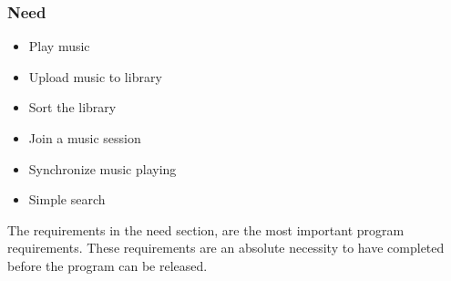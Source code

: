 \subsubsection{Need}


\begin{itemize}
	\item Play music
	\item Upload music to library
	\item Sort the library
	\item Join a music session
	\item Synchronize music playing
	\item Simple search
\end{itemize}


The requirements in the need section, are the most important program requirements. These requirements are an absolute necessity to have completed before the program can be released.